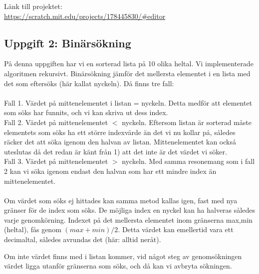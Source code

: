 \documentclass[12pt,a4paper]{article}
\begin{document}

Länk till projektet:  \\
 \url{https://scratch.mit.edu/projects/178445830/#editor }
\subsection{Uppgift 2: Binärsökning}
På denna uppgiften har vi en sorterad lista på 10 olika heltal.
Vi implementerade algoritmen rekursivt. Binärsökning jämför det mellersta elementet i en lista med det som eftersöks (här kallat nyckeln). Då finns tre fall:    \\ \\
Fall 1. Värdet på mittenelementet i listan = nyckeln. Detta medför att elementet som söks har funnits, och vi kan skriva ut dess index.  \\
Fall 2. Värdet på mittenelementet $<$ nyckeln. Eftersom listan är sorterad måste elementets som söks ha ett större indexvärde än det vi nu kollar på, således räcker det att söka igenom den halvan av listan. Mittenelementet kan också uteslutas då det redan är känt från 1) att det inte är det värdet vi söker. \\
Fall 3. Värdet på mittenelementet $>$ nyckeln. Med samma resonemang som i fall 2 kan vi söka igenom endast den halvan som har ett mindre index än mittenelementet.\\ \\
Om värdet som söks ej hittades kan samma metod kallas igen, fast med nya gränser för de index som söks. De möjliga index en nyckel kan ha halveras således varje genomkörning. Indexet på det mellersta elementet inom gränserna max,min (heltal), fås genom  $(max + min)/2$. Detta värdet kan emellertid vara ett decimaltal, således avrundas det (här: alltid neråt). 	

Om inte värdet finns med i listan kommer, vid något steg av genomsökningen värdet ligga utanför gränserna som söks, och då kan vi avbryta sökningen. 
\end{document}
